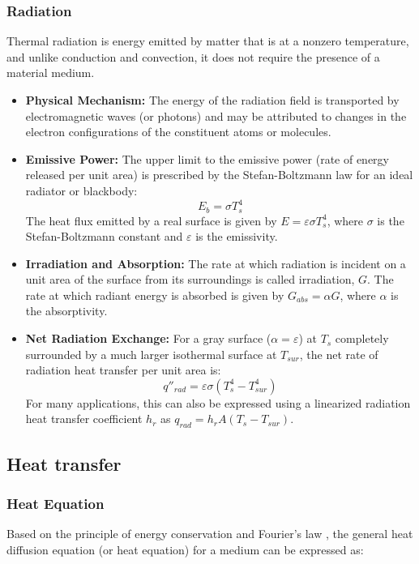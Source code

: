 \documentclass[a4paper,12pt,twoside]{report}     %
\begin{document}
\subsubsection{Radiation}
Thermal radiation is energy emitted by matter that is at a nonzero temperature, and unlike conduction and convection, it does not require the presence of a material medium.
\begin{itemize}
    \item \textbf{Physical Mechanism:} The energy of the radiation field is transported by electromagnetic waves (or photons) and may be attributed to changes in the electron configurations of the constituent atoms or molecules.
    \item \textbf{Emissive Power:} The upper limit to the emissive power (rate of energy released per unit area) is prescribed by the Stefan-Boltzmann law for an ideal radiator or blackbody:
    \begin{equation}
        E_b = \sigma T_s^4
    \end{equation}
    The heat flux emitted by a real surface is given by $E = \varepsilon \sigma T_s^4$, where $\sigma$ is the Stefan-Boltzmann constant and $\varepsilon$ is the emissivity.
    \item \textbf{Irradiation and Absorption:} The rate at which radiation is incident on a unit area of the surface from its surroundings is called irradiation, $G$. The rate at which radiant energy is absorbed is given by $G_{abs} = \alpha G$, where $\alpha$ is the absorptivity.
    \item \textbf{Net Radiation Exchange:} For a gray surface ($\alpha = \varepsilon$) at $T_s$ completely surrounded by a much larger isothermal surface at $T_{sur}$, the net rate of radiation heat transfer per unit area is:
    \begin{equation}
        q''_{rad} = \varepsilon \sigma (T_s^4 - T_{sur}^4)
    \end{equation}
    For many applications, this can also be expressed using a linearized radiation heat transfer coefficient $h_r$ as $q_{rad} = h_r A (T_s - T_{sur})$.
\end{itemize}

\subsection{Heat transfer}

\subsubsection{Heat Equation}
Based on the principle of energy conservation and Fourier's law \cite{di_paola_starting_2023}, the general heat diffusion equation (or heat equation) for a medium can be expressed as:
\end{document}
